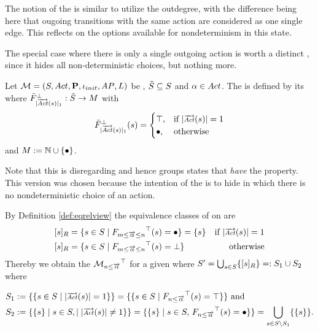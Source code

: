 \documentclass[preview]{standalone}
\begin{document}
The notion of the \viewN \viewoutactsetsize is similar to utilize the outdegree, with the difference being here that ougoing transitions with the same action are considered as one single edge. This reflects on the options available for nondeterminism in this state.

The special case where there is only a single outgoing action is worth a distinct \viewN, since it hides all non-deterministic choices, but nothing more.

\begin{definition}
	Let ${{{\mathcal{M}}}} = {{({S}, {Act}, {\textbf{P}}, {\iota_{init}}, {AP}, {L})}}$ be \achgphN, ${\tilde{{S}}} \subseteq {S}$ and ${\alpha} \in {Act}$. The \viewN \viewoutactsingle is defined by its \grpfctN \gfctoutactsingle where $\gfctsuboutactsingle : \smstates \to \imggrp$ with
	\[
	\gfctsuboutactsingle(\state) =
	\begin{cases}
		\hasppty, &\text{if } |\outacts(\state)| = 1 \\ 
		\remelem, &\text{otherwise}
	\end{cases}
	\]
	and $\imggrp := \natnums \cup \remset$.
\end{definition}

Note that this \viewN is disregarding \notppty and hence groups states that \emph{have} the property. This version was chosen because the intention of the \viewN is to hide \states in which there is no nondeterministic choice of an action. 

\noindent By Definition \ref{def:eqrelview} the equivalence classes of \eqrelview on \states are 
\begin{align*}
	\eqclassv &= \{\state \in \states \mid \gfctspanoutaction(\state) = \remelem\} = \{\state\} &\text{if } |\outacts(\state)|=1 \\
	\eqclassv &= \{\state \in \states \mid \gfctspanoutaction(\state) = \notppty\} &\text{otherwise}	
\end{align*}
\noindent Thereby we obtain the \viewN ${{{{{\mathcal{M}}}}_{{{n}\leq{\overrightarrow{\ensuremath{{\alpha}}}}}}}^{\top}}$ for a given \chgphN \chgph where ${S}' = \bigcup_{{s} \in {S}} \{{{[{s}]_{{R}}}}\} =: {S}_1 \cup {S}_2$ where 

\begin{align*}
	\states_1 &:= \{\{ \state \in \states \mid |\outacts(\state)| = 1\}\} = \{\{\state \in \states \mid \gfctminoutaction(\state) = \hasppty\}\} \text{  and} \\
	\states_2 &:= \{\{\state\} \mid \state \in \states, \mid |\outacts(\state)| \neq 1\}\} = \{\{\state\} \mid \state \in \states, \, \gfctminoutaction(\state) = \remelem\}\} = \nogroupstates[\states_1].
\end{align*}
\end{document}

